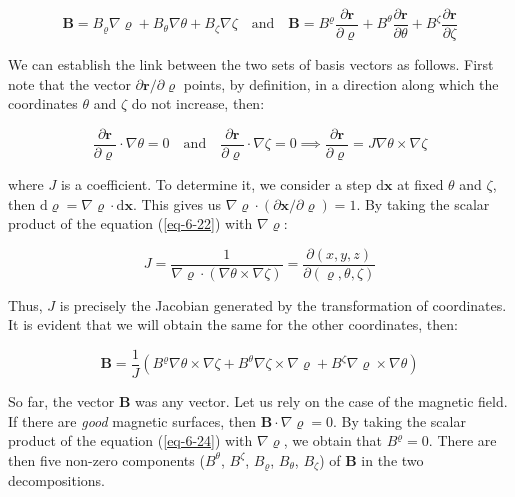 \begin{equation}
    \label{eq-6-21}
    \mathbf{B}=B_\varrho\nabla\varrho+B_\theta\nabla\theta+B_\zeta\nabla\zeta\quad\text{and}\quad\mathbf{B}=B^\varrho\frac{\partial\mathbf{r}}{\partial\varrho}+B^\theta\frac{\partial\mathbf{r}}{\partial\theta}+B^\zeta\frac{\partial\mathbf{r}}{\partial\zeta}
\end{equation}

We can establish the link between the two sets of basis vectors as follows. First note that the vector $\partial\mathbf{r}/\partial\varrho$ points, by definition, in a direction along which the coordinates $\theta$ and $\zeta$ do not increase, then:

\begin{equation}
    \label{eq-6-22}
    \frac{\partial\mathbf{r}}{\partial\varrho}\cdot\nabla\theta=0\quad\text{and}\quad\frac{\partial\mathbf{r}}{\partial\varrho}\cdot\nabla\zeta=0\implies\frac{\partial\mathbf{r}}{\partial\varrho}=J\nabla\theta\times\nabla\zeta
\end{equation}

where $J$ is a coefficient. To determine it, we consider a step $\mathrm{d}\mathbf{x}$ at fixed $\theta$ and $\zeta$, then $\mathrm{d}\varrho=\nabla\varrho\cdot\mathrm{d}\mathbf{x}$. This gives us $\nabla\varrho\cdot(\partial\mathbf{x}/\partial\varrho)=1$. By taking the scalar product of the equation (\ref{eq-6-22}) with $\nabla\varrho$:

\begin{equation}
    \label{eq-6-23}
    J=\frac{1}{\nabla\varrho\cdot(\nabla\theta\times\nabla\zeta)}=\frac{\partial(x, y, z)}{\partial(\varrho, \theta, \zeta)}
\end{equation}

Thus, $J$ is precisely the Jacobian generated by the transformation of coordinates. It is evident that we will obtain the same for the other coordinates, then:

\begin{equation}
    \label{eq-6-24}
    \mathbf{B}=\frac{1}{J}\left(B^\varrho\nabla\theta\times\nabla\zeta+B^\theta\nabla\zeta\times\nabla\varrho+B^\zeta\nabla\varrho\times\nabla\theta\right)
\end{equation}

So far, the vector $\mathbf{B}$ was any vector. Let us rely on the case of the magnetic field. If there are \textit{good} magnetic surfaces, then $\mathbf{B}\cdot\nabla\varrho=0$. By taking the scalar product of the equation (\ref{eq-6-24}) with $\nabla\varrho$, we obtain that $B^\varrho=0$. There are then five non-zero components ($B^\theta$, $B^\zeta$, $B_\varrho$, $B_\theta$, $B_\zeta$) of $\mathbf{B}$ in the two decompositions.

